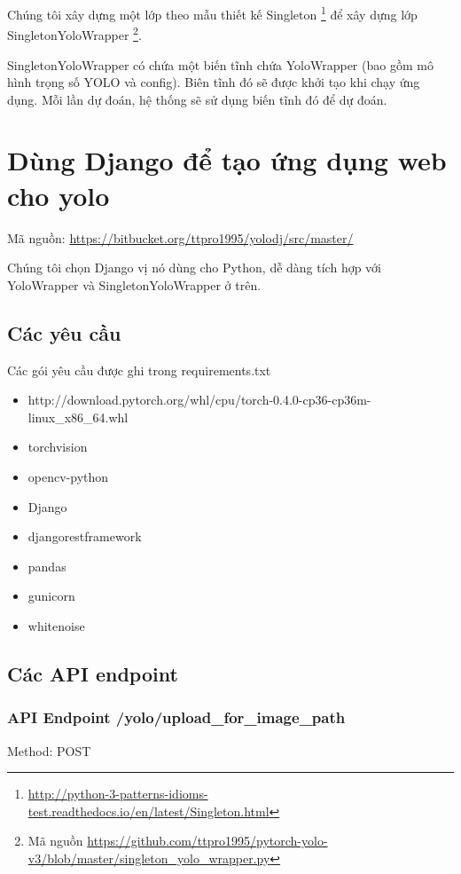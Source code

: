 Chúng tôi xây dựng một lớp theo mẫu thiết kế Singleton \footnote{\url{http://python-3-patterns-idioms-test.readthedocs.io/en/latest/Singleton.html}} để xây dựng lớp SingletonYoloWrapper \footnote{Mã nguồn \url{https://github.com/ttpro1995/pytorch-yolo-v3/blob/master/singleton_yolo_wrapper.py}}.

SingletonYoloWrapper có chứa một biến tĩnh chứa YoloWrapper (bao gồm mô hình trọng số YOLO và config). Biên tĩnh đó sẽ được khởi tạo khi chạy ứng dụng. Mỗi lần dự đoán, hệ thống sẽ sử dụng biến tĩnh đó để dự đoán. 


\section{Dùng Django để tạo ứng dụng web cho yolo}

Mã nguồn: \url{https://bitbucket.org/ttpro1995/yolodj/src/master/}

Chúng tôi chọn Django vị nó dùng cho Python, dễ dàng tích hợp với YoloWrapper và SingletonYoloWrapper ở trên.

\subsection{Các yêu cầu}

Các gói yêu cầu được ghi trong requirements.txt

\begin{itemize}
\item http://download.pytorch.org/whl/cpu/torch-0.4.0-cp36-cp36m-linux\_x86\_64.whl
\item torchvision
\item opencv-python
\item Django
\item djangorestframework
\item pandas
\item gunicorn
\item whitenoise
\end{itemize}

\subsection{Các API endpoint}

\subsubsection{API Endpoint /yolo/upload\_for\_image\_path}
Method: POST

